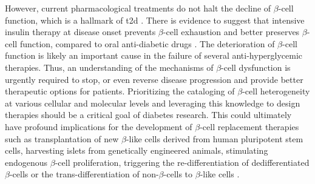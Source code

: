 \par However, current pharmacological treatments do not halt the decline of $\beta$-cell function, which is a hallmark of \gls{t2d} . There is evidence to suggest that intensive insulin therapy at disease onset prevents $\beta$-cell exhaustion and better preserves $\beta$-cell function, compared to oral anti-diabetic drugs \textbf{\cite{wysham_beta-cell_2020}}. The deterioration of $\beta$-cell function is likely an important cause in the failure of several anti-hyperglycemic therapies. Thus, an understanding of the mechanisms of $\beta$-cell dysfunction is urgently required to stop, or even reverse disease progression and provide better therapeutic options for patients. Prioritizing the cataloging of $\beta$-cell heterogeneity at various cellular and molecular levels and leveraging this knowledge to design therapies should be a critical goal of diabetes research. This could ultimately have profound implications for the development of $\beta$-cell replacement therapies such as transplantation of new $\beta$-like cells derived from human pluripotent stem cells, harvesting islets from genetically engineered animals, stimulating endogenous $\beta$-cell proliferation, triggering the re-differentiation of dedifferentiated $\beta$-cells or the trans-differentiation of non-$\beta$-cells to $\beta$-like cells \textbf{\cite{zhou_pancreas_2018}}.\\

